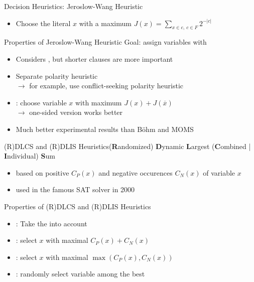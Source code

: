 \documentclass[t]{sdqbeamer}
\begin{document}
\begin{frame}{Decision Heuristics: Jeroslow-Wang Heuristic}
\begin{itemize}\setlength{\itemsep}{1ex}
	\item Choose the literal $x$ with a maximum $J(x) = \sum_{x \in c,\ c \in F} 2^{-|c|}$
\end{itemize}
\begin{block}{Properties of Jeroslow-Wang Heuristic}
	Goal: assign variables with \\[1ex]
	\begin{itemize}\setlength{\itemsep}{1em}
		\item Considers , but shorter clauses are more important
		\item Separate polarity heuristic\\
		$\rightarrow$ for example, use conflict-seeking polarity heuristic
		\item {}: choose variable $x$ with maximum $J(x)+J(\overline{x})$\\
		$\rightarrow$ one-sided version works better
	\item Much better experimental results than B{\"o}hm and MOMS
\end{itemize}
\end{block}
\end{frame}
	
\begin{frame}{(R)DLCS and (R)DLIS Heuristics}{(\textbf{R}andomized) \textbf{D}ynamic \textbf{L}argest (\textbf{C}ombined | \textbf{I}ndividual) \textbf{S}um}
\begin{itemize}\setlength{\itemsep}{1ex}
	\item based on positive $C_P(x)$ and negative occurences $C_N(x)$ of variable $x$
	\item used in the famous SAT solver  in 2000
\end{itemize}
\begin{block}{Properties of (R)DLCS and (R)DLIS Heuristics}
\begin{itemize}\setlength{\itemsep}{1em}
	\item {}: Take the  into account
	\item {}: select $x$ with maximal $C_P(x)+C_N(x)$
	\item {}: select $x$ with maximal $\operatorname{max}(C_P(x),C_N(x))$
	\item {}: randomly select variable among the best
\end{itemize}
\end{block}
\end{frame}
	
\end{document}
